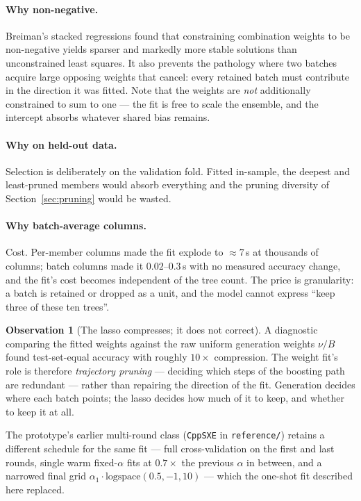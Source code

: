 \documentclass[11pt,a4paper]{article}
\newcommand{\code}[1]{\texttt{\small #1}}
\theoremstyle{definition}
\newtheorem{observation}{Observation}
\begin{document}
\paragraph{Why non-negative.} Breiman's stacked regressions
\cite{breiman1996stacked} found that constraining combination weights to be
non-negative yields sparser and markedly more stable solutions than
unconstrained least squares. It also prevents the pathology where two batches
acquire large opposing weights that cancel: every retained batch must
contribute in the direction it was fitted. Note that the weights are
\emph{not} additionally constrained to sum to one --- the fit is free to scale
the ensemble, and the intercept absorbs whatever shared bias remains.

\paragraph{Why on held-out data.} Selection is deliberately on the validation
fold. Fitted in-sample, the deepest and least-pruned members would absorb
everything and the pruning diversity of Section~\ref{sec:pruning} would be
wasted.

\paragraph{Why batch-average columns.} Cost. Per-member columns made the fit
explode to $\approx 7$\,s at thousands of columns; batch columns made it
$0.02$--$0.3$\,s with no measured accuracy change, and the fit's cost becomes
independent of the tree count. The price is granularity: a batch is retained or
dropped as a unit, and the model cannot express ``keep three of these ten
trees''.

\begin{observation}[The lasso compresses; it does not correct]
A diagnostic comparing the fitted weights against the raw uniform generation
weights $\nu/B$ found test-set-equal accuracy with roughly $10\times$
compression. The weight fit's role is therefore \emph{trajectory pruning} ---
deciding which steps of the boosting path are redundant --- rather than
repairing the direction of the fit. Generation decides where each batch points;
the lasso decides how much of it to keep, and whether to keep it at all.
\end{observation}

The prototype's earlier multi-round class (\code{CppSXE} in \code{reference/})
retains a different schedule for the same fit --- full cross-validation on the
first and last rounds, single warm fixed-$\alpha$ fits at $0.7\times$ the
previous $\alpha$ in between, and a narrowed final grid
$\alpha_1 \cdot \text{logspace}(0.5, -1, 10)$ --- which the one-shot fit
described here replaced.
\end{document}
